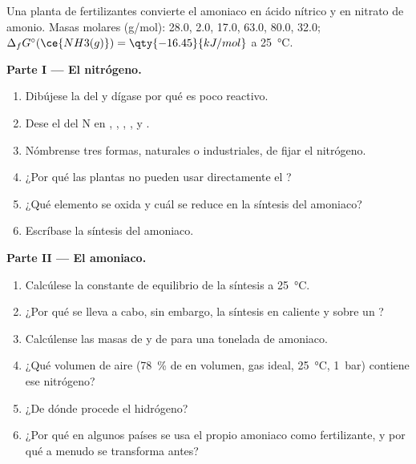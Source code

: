 \begin{problem}
\label{pb:b1:p-block-13-15:1}
Una planta de fertilizantes convierte el amoniaco en ácido nítrico y en
nitrato de amonio. Masas molares (\unit{g/mol}):  28.0, 
2.0, 
17.0,  63.0,  80.0,  32.0;
$\Delta_f G^\circ(\ce{NH3(g)}) = \qty{-16.45}{kJ/mol}$ a
\qty{25}{\celsius}.

\medskip
\noindent\textbf{Parte I --- El nitrógeno.}
\begin{enumerate}
  \item Dibújese la  del  y dígase por qué es
        poco reactivo.
  \item Dese el  del N en , , ,
        ,  y .
  \item Nómbrense tres formas, naturales o industriales, de fijar el
        nitrógeno.
  \item ¿Por qué las plantas no pueden usar directamente el ?
  \item ¿Qué elemento se oxida y cuál se reduce en la síntesis del
        amoniaco?
  \item Escríbase la síntesis del amoniaco.
\end{enumerate}

\medskip
\noindent\textbf{Parte II --- El amoniaco.}
\begin{enumerate}[resume]
  \item Calcúlese la constante de equilibrio de la síntesis a
        \qty{25}{\celsius}.
  \item ¿Por qué se lleva a cabo, sin embargo, la síntesis en caliente y
        sobre un ?
  \item Calcúlense las masas de  y de  para una tonelada de
        amoniaco.
  \item ¿Qué volumen de aire (\qty{78}{\percent} de  en volumen,
        gas ideal, \qty{25}{\celsius}, \qty{1}{bar}) contiene ese
        nitrógeno?
  \item ¿De dónde procede el hidrógeno?
  \item ¿Por qué en algunos países se usa el propio amoniaco como
        fertilizante, y por qué a menudo se transforma antes?
\end{enumerate}


\end{problem}
